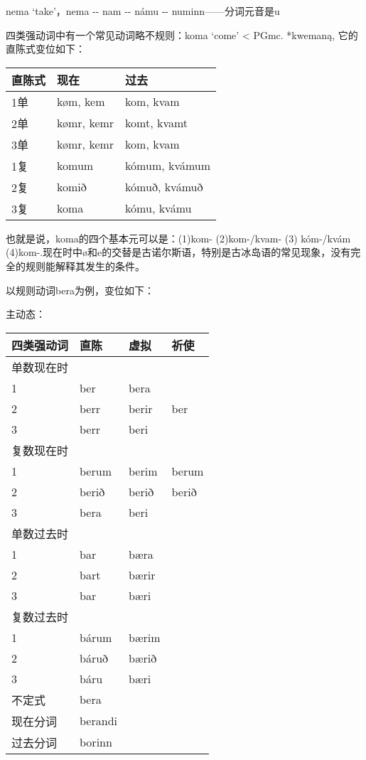 nema `take‌'，nema -\/- nam -\/- námu -\/- numinn------分词元音是u

四类强动词中有一个常见动词略不规则：koma `come' \textless{} PGmc.
*kwemaną, 它的直陈式变位如下：

\begin{longtable}{lll}
\toprule
直陈式 & 现在 & 过去 \\
\midrule
\endhead
\bottomrule
\endfoot
1单 & køm, kem & kom, kvam \\
2单 & kømr, kemr & komt, kvamt \\
3单 & kømr, kemr & kom, kvam \\
1复 & komum & kómum, kvámum \\
2复 & komið & kómuð, kvámuð \\
3复 & koma & kómu, kvámu \\
\end{longtable}

也就是说，koma的四个基本元可以是：(1)kom- (2)kom-/kvam- (3) kóm-/kvám
(4)kom-.现在时中ø和e的交替是古诺尔斯语，特别是古冰岛语的常见现象，没有完全的规则能解释其发生的条件。

以规则动词bera为例，变位如下：

主动态：

\begin{longtable}{llll}
\toprule
四类强动词 & 直陈 & 虚拟 & 祈使 \\
\midrule
\endhead
\bottomrule
\endfoot
单数现在时 & & & \\
1 & ber & bera & \\
2 & berr & berir & ber \\
3 & berr & beri & \\
复数现在时 & & & \\
1 & berum & berim & berum \\
2 & berið & berið & berið \\
3 & bera & beri & \\
单数过去时 & & & \\
1 & bar & bæra & \\
2 & bart & bærir & \\
3 & bar & bæri & \\
复数过去时 & & & \\
1 & bárum & bærim & \\
2 & báruð & bærið & \\
3 & báru & bæri & \\
不定式 & bera & & \\
现在分词 & berandi & & \\
过去分词 & borinn & & \\
\end{longtable}

